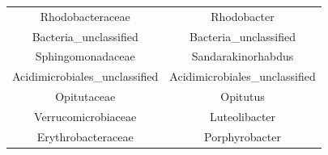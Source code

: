 \documentclass[]{article}
\begin{document}
\begin{longtable}[]{@{}cc@{}}
\begin{minipage}[t]{0.42\columnwidth}\centering\strut
Rhodobacteraceae\strut
\end{minipage} & \begin{minipage}[t]{0.42\columnwidth}\centering\strut
Rhodobacter\strut
\end{minipage}\tabularnewline
\begin{minipage}[t]{0.42\columnwidth}\centering\strut
Bacteria\_unclassified\strut
\end{minipage} & \begin{minipage}[t]{0.42\columnwidth}\centering\strut
Bacteria\_unclassified\strut
\end{minipage}\tabularnewline
\begin{minipage}[t]{0.42\columnwidth}\centering\strut
Sphingomonadaceae\strut
\end{minipage} & \begin{minipage}[t]{0.42\columnwidth}\centering\strut
Sandarakinorhabdus\strut
\end{minipage}\tabularnewline
\begin{minipage}[t]{0.42\columnwidth}\centering\strut
Acidimicrobiales\_unclassified\strut
\end{minipage} & \begin{minipage}[t]{0.42\columnwidth}\centering\strut
Acidimicrobiales\_unclassified\strut
\end{minipage}\tabularnewline
\begin{minipage}[t]{0.42\columnwidth}\centering\strut
Opitutaceae\strut
\end{minipage} & \begin{minipage}[t]{0.42\columnwidth}\centering\strut
Opitutus\strut
\end{minipage}\tabularnewline
\begin{minipage}[t]{0.42\columnwidth}\centering\strut
Verrucomicrobiaceae\strut
\end{minipage} & \begin{minipage}[t]{0.42\columnwidth}\centering\strut
Luteolibacter\strut
\end{minipage}\tabularnewline
\begin{minipage}[t]{0.42\columnwidth}\centering\strut
Erythrobacteraceae\strut
\end{minipage} & \begin{minipage}[t]{0.42\columnwidth}\centering\strut
Porphyrobacter\strut
\end{minipage}\tabularnewline
\bottomrule
\end{longtable}
\end{document}
